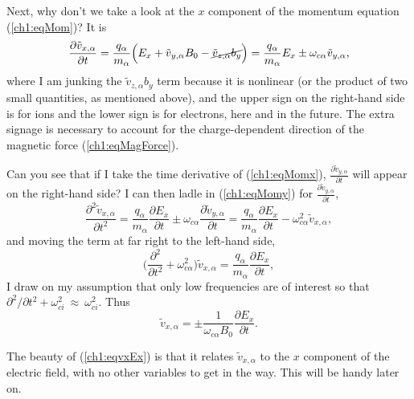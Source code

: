 Next, why don't we take a look at the $x$ component of the momentum equation
(\ref{ch1:eqMom})? It is
\begin{equation} \label{ch1:eqMomx} \dfrac{\partial \tilde v_{x,\alpha}}{\partial t} =
  \dfrac{q_\alpha}{m_\alpha} \Big ( E_x + \tilde v_{y,\alpha} B_0 - \cancel{\tilde v_{z,\alpha} b_y}
  \Big ) = \dfrac{q_\alpha}{m_\alpha} E_x \pm \omega_{c \alpha} \tilde v_{y,\alpha},
\end{equation}
where I am junking the $\tilde v_{z,\alpha} b_y$ term because it is nonlinear
(or the product of two small quantities, as mentioned above), and the upper sign
on the right-hand side is for ions and the lower sign is for electrons, here and
in the future. The extra signage is necessary to account for the
charge-dependent direction of the magnetic force (\ref{ch1:eqMagForce}).

Can you see that if I take the time derivative of (\ref{ch1:eqMomx}),
$\frac{\partial \tilde v_{y,\alpha}}{\partial t}$ will appear on the right-hand
side?  I can then ladle in (\ref{ch1:eqMomy}) for
$\frac{\partial \tilde v_{y,\alpha}}{\partial t}$,
\begin{equation*} \label{ch1:eqMomxdt} \dfrac{\partial^2 \tilde
    v_{x,\alpha}}{\partial t^2} = \dfrac{q_\alpha}{m_\alpha}\dfrac{\partial
    E_x}{\partial t} \pm \omega_{c \alpha} \dfrac{\partial \tilde
    v_{y,\alpha}}{\partial t} = \dfrac{q_\alpha}{m_\alpha}\dfrac{\partial
    E_x}{\partial t} - \omega_{c \alpha}^2 \tilde v_{x,\alpha},
\end{equation*}
and moving the term at far right to the left-hand side,
\begin{equation*} \Big ( \dfrac{\partial^2}{\partial t^2} + \omega_{c \alpha}^2
  \Big ) \tilde v_{x,\alpha} = \dfrac{q_\alpha}{m_\alpha}\dfrac{\partial E_x}{\partial
    t},
\end{equation*}
I draw on my assumption that only low frequencies are of interest so that
$\partial^2 / \partial t^2 + \omega_{c i}^2~\approx~\omega_{c i}^2$. Thus
\begin{equation} \label{ch1:eqvxEx}
  \tilde v_{x,\alpha} = \pm \dfrac{1}{\omega_{c \alpha} B_0}\dfrac{\partial
    E_x}{\partial t}.
\end{equation}

The beauty of (\ref{ch1:eqvxEx}) is that it relates $\tilde v_{x,\alpha}$ to the
$x$ component of the electric field, with no other variables to get in the
way. This will be handy later on.

